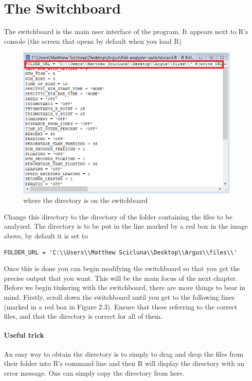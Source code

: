 \documentclass[12pt,titlepage]{report}
\begin{document}
\pagebreak
\section{The Switchboard}
The switchboard is the main user interface of the program. It appears next to R's console (the screen that opens by default when you load R)
\begin{figure}[ht!]
\centering
\includegraphics[width=120mm]{image6.png}
\caption{where the directory is on the switchboard}
\label{overflow}
\end{figure}

Change this directory to the directory of the folder containing the files to be analyzed. The directory is to be put in the line marked by a red box in the image above, by default it is set to
\begin{verbatim}
FOLDER_URL = 'C:\\Users\\Matthew Scicluna\\Desktop\\Argus\\files\\'
\end{verbatim}
Once this is done you can begin modifying the switchboard so that you get the precise output that you want. This will be the main focus of the next chapter.
Before we begin tinkering with the switchboard, there are more things to bear in mind. Firstly, scroll down the switchboard until you get to the following lines (marked in a red box in Figure 2.3). Ensure that these referring to the correct files, and that the directory is correct for all of them. 
\paragraph{Useful trick} An easy way to obtain the directory is to simply to drag and drop the files from their folder into R's command line and then R will display the directory with an error message. One can simply copy the directory from here. \\
\end{document}
